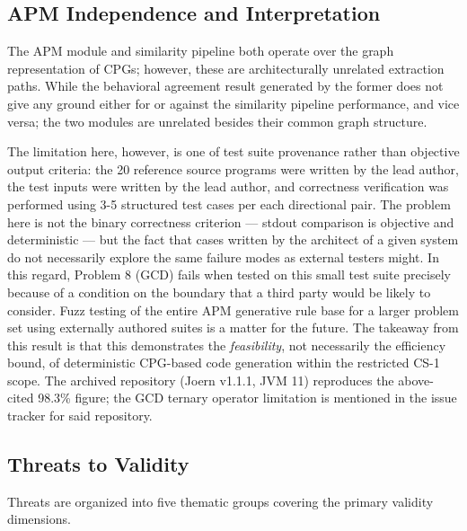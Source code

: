 \subsection{APM Independence and Interpretation}
\label{subsec:apm_discussion}

The APM module and similarity pipeline both operate over the graph representation of CPGs; however, these are architecturally unrelated extraction paths. While the behavioral agreement result generated by the former does not give any ground either for or against the similarity pipeline performance, and vice versa; the two modules are unrelated besides their common graph structure.

The limitation here, however, is one of test suite provenance rather than objective output criteria: the 20 reference source programs were written by the lead author, the test inputs were written by the lead author, and correctness verification was performed using 3-5 structured test cases per each directional pair. The problem here is not the binary correctness criterion --- stdout comparison is objective and deterministic --- but the fact that cases written by the architect of a given system do not necessarily explore the same failure modes as external testers might. In this regard, Problem 8 (GCD) fails when tested on this small test suite precisely because of a condition on the boundary that a third party would be likely to consider. Fuzz testing of the entire APM generative rule base for a larger problem set using externally authored suites is a matter for the future. The takeaway from this result is that this demonstrates the \textit{feasibility}, not necessarily the efficiency bound, of deterministic CPG-based code generation within the restricted CS-1 scope. The archived repository (Joern v1.1.1, JVM 11) reproduces the above-cited 98.3\% figure; the GCD ternary operator limitation is mentioned in the issue tracker for said repository.

\subsection{Threats to Validity}
\label{subsec:threats}

Threats are organized into five thematic groups covering the primary validity dimensions.

